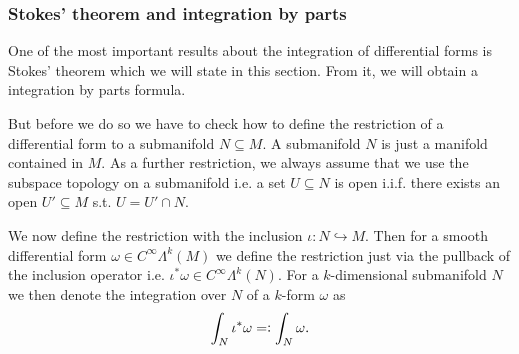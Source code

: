 \documentclass[../main.tex]{subfiles}
\begin{document}
\subsubsection{Stokes' theorem and integration by parts} 

One of the most important results about the integration of differential forms
is Stokes' theorem which we will state in this section. From it, we will 
obtain a integration by parts formula.

But before we do so we have to check how to define the restriction of a
differential form to a submanifold $N \subseteq M$. A submanifold $N$ 
is just a manifold contained in $M$. As a further restriction, we always assume
that we use the subspace topology on a submanifold i.e. a set $U \subseteq N$ 
is open i.i.f. there exists an open $U' \subseteq M$ s.t. $U = U' \cap N$.

We now define the restriction with the inclusion $\iota: N \hookrightarrow M$. Then for a 
smooth differential form $\omega \in C^\infty \Lambda^k (M)$ we define 
the restriction just via the pullback of the inclusion operator i.e. 
$\iota^* \omega \in C^\infty \Lambda^k(N)$. 
For a $k$-dimensional submanifold $N$ we then denote the integration over $N$ of a 
$k$-form $\omega$ as
\begin{align*}
    \int_N \iota^*\omega =\vcentcolon \int_N \omega.
\end{align*} 
\end{document}
